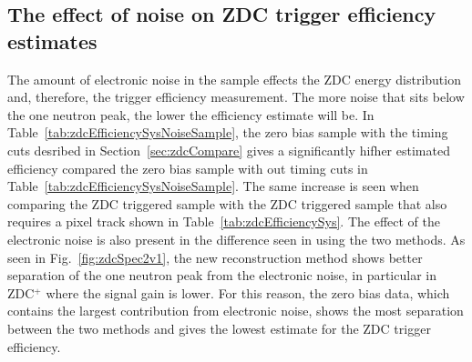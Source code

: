     \subsection{The effect of noise on ZDC trigger efficiency estimates}
      The amount of electronic noise in the sample effects the ZDC energy 
        distribution and, therefore, the trigger efficiency measurement.
      The more noise that sits below the one neutron peak, the lower the 
        efficiency estimate will be. 
      In Table~\ref{tab:zdcEfficiencySysNoiseSample}, the zero bias sample 
        with the timing cuts desribed in Section~\ref{sec:zdcCompare} gives a 
        significantly hifher 
        estimated efficiency compared the zero bias sample with out timing cuts
        in Table~\ref{tab:zdcEfficiencySysNoiseSample}.
      The same increase is seen when comparing the ZDC triggered sample with 
        the ZDC triggered sample that also requires a pixel track shown in
        Table~\ref{tab:zdcEfficiencySys}. 
      The effect of the electronic noise is also present in the difference seen
        in using the two methods.
      As seen in Fig.~\ref{fig:zdcSpec2v1}, the new reconstruction method 
        shows better separation of the one neutron peak from the electronic 
        noise, in particular in ZDC$^{+}$ where the signal gain is lower.
      For this reason, the zero bias data, which contains the largest 
        contribution from electronic noise, shows the most separation between 
        the two methods and gives the lowest estimate for the ZDC trigger 
        efficiency.
